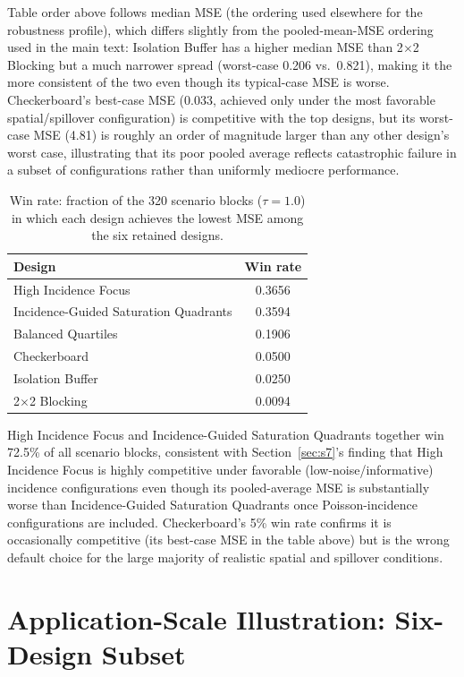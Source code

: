 \documentclass[11pt]{article}
\begin{document}
Table order above follows median MSE (the ordering used elsewhere for the
robustness profile), which differs slightly from the pooled-mean-MSE ordering
used in the main text: Isolation Buffer has a higher median MSE than
2$\times$2 Blocking but a much narrower spread (worst-case 0.206 vs.\ 0.821),
making it the more consistent of the two even though its typical-case MSE is
worse. Checkerboard's best-case MSE (0.033, achieved only under the most
favorable spatial/spillover configuration) is competitive with the top
designs, but its worst-case MSE (4.81) is roughly an order of magnitude
larger than any other design's worst case, illustrating that its poor pooled
average reflects catastrophic failure in a subset of configurations rather
than uniformly mediocre performance.

\begin{table}[h]
\centering
\caption{Win rate: fraction of the 320 scenario blocks ($\tau=1.0$) in which
each design achieves the lowest MSE among the six retained designs.}
\begin{tabular}{lc}
\toprule
Design & Win rate \\
\midrule
High Incidence Focus                  & 0.3656 \\
Incidence-Guided Saturation Quadrants & 0.3594 \\
Balanced Quartiles                    & 0.1906 \\
Checkerboard                          & 0.0500 \\
Isolation Buffer                      & 0.0250 \\
2$\times$2 Blocking                   & 0.0094 \\
\bottomrule
\end{tabular}
\end{table}

High Incidence Focus and Incidence-Guided Saturation Quadrants together win
72.5\% of all scenario blocks, consistent with Section~\ref{sec:s7}'s finding
that High Incidence Focus is highly competitive under favorable
(low-noise/informative) incidence configurations even though its pooled-average
MSE is substantially worse than Incidence-Guided Saturation Quadrants once
Poisson-incidence configurations are included. Checkerboard's 5\% win rate
confirms it is occasionally competitive (its best-case MSE in the table above)
but is the wrong default choice for the large majority of realistic spatial and
spillover conditions.

\section{Application-Scale Illustration: Six-Design Subset}
\label{sec:s11}
\end{document}
